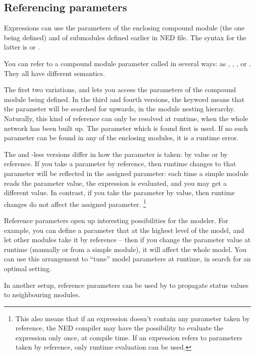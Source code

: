 \subsection{Referencing parameters}

Expressions can use the parameters of the enclosing compound module
(the one being defined) and of submodules defined earlier in NED file.
The syntax for the latter is  or .

You can refer to a compound module parameter called 
in several ways: as , ,
, or .
They all have different semantics.

The first two variations,  and 
lets you access the parameters of the compound module being
defined. In the third and fourth versions, the keyword
 means that the parameter will be searched for upwards,
in the module nesting hierarchy. Naturally, this kind of reference can
only be resolved at runtime, when the whole network has been built up.
The parameter which is found first is used. If no such parameter can be
found in any of the enclosing modules, it is a runtime error.

The  and -less versions differ in how the parameter
is taken: by value or by reference. If you take a parameter by reference,
then runtime changes to that parameter will be reflected in the
assigned parameter: each time a simple module reads the parameter
value, the expression is evaluated, and you may get a different value.
In contrast, if you take the parameter by value, then runtime changes
do not affect the assigned parameter.
  \footnote{This also means that if an expression doesn't contain any parameter
  taken by reference, the NED compiler may have the possibility to evaluate
  the expression only once, at compile time. If an expression refers
  to parameters taken by reference, only runtime evaluation can be used.}

Reference parameters open up interesting possibilities for the modeler.
For example, you can define a parameter that at the highest level
of the model, and let other modules take it by reference --
then if you change the parameter value at runtime
(manually or from a simple module), it will affect the whole model.
You can use this arrangement to ``tune'' model parameters at runtime,
in search for an optimal setting.

In another setup, reference parameters can be used by to propagate
status values to neighbouring modules.



